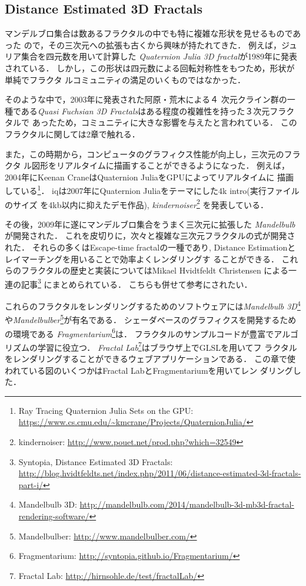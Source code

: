 \subsection{Distance Estimated 3D Fractals}

マンデルブロ集合は数あるフラクタルの中でも特に複雑な形状を見せるものであった
ので，その三次元への拡張も古くから興味が持たれてきた．
例えば，ジュリア集合を四元数を用いて計算した
\textit{Quaternion Julia 3D fractal}\cite{hart1989ray}が1989年に発表されている．
しかし，この形状は四元数による回転対称性をもつため，形状が単純でフラクタ
ルコミュニティの満足のいくものではなかった．

そのような中で，2003年に発表された阿原・荒木による４
次元クライン群の一種である\textit{Quasi Fuchsian 3D
Fractals}\cite{ahara2003sphairahedral}はある程度の複雑性を持った３次元フラクタルで
あったため，コミュニティに大きな影響を与えたと言われている．
このフラクタルに関しては2章で触れる．

また，この時期から，コンピュータのグラフィクス性能が向上し，三次元のフラクタ
ル図形をリアルタイムに描画することができるようになった．
例えば，2004年にKeenan CraneはQuaternion JuliaをGPUによってリアルタイムに
描画している\footnote{Ray Tracing Quaternion Julia Sets on
the GPU:
\url{https://www.cs.cmu.edu/~kmcrane/Projects/QuaternionJulia/}}．
iqは2007年にQuaternion Juliaをテーマにした4k intro(実行ファイルのサイズ
を4kb以内に抑えたデモ作品),
\textit{kindernoiser}\footnote{kindernoiser: \url{http://www.pouet.net/prod.php?which=32549}}
を発表している．

その後，2009年に遂にマンデルブロ集合をうまく三次元に拡張した
\textit{Mandelbulb}が開発された．
これを皮切りに，次々と複雑な三次元フラクタルの式が開発された．
それらの多くはEscape-time fractalの一種であり,
Distance Estimationとレイマーチングを用いることで効率よくレンダリングす
ることができる．
これらのフラクタルの歴史と実装についてはMikael Hvidtfeldt Christensen
による一連の記事\footnote{Syntopia, Distance Estimated 3D
Fractals:\\ \quad \quad
\url{http://blog.hvidtfeldts.net/index.php/2011/06/distance-estimated-3d-fractals-part-i/}}
にまとめられている．
こちらも併せて参考にされたい．

これらのフラクタルをレンダリングするためのソフトウェアには\textit{Mandelbulb
3D}\footnote{Mandelbulb 3D:
\url{http://mandelbulb.com/2014/mandelbulb-3d-mb3d-fractal-rendering-software/}}
や\textit{Mandelbulber}\footnote{Mandelbulber:
\url{http://www.mandelbulber.com/}}が有名である．
シェーダベースのグラフィクスを開発するための環境である
\textit{Fragmentarium}\footnote{Fragmentarium:
\url{http://syntopia.github.io/Fragmentarium/}}は．
フラクタルのサンプルコードが豊富でアルゴリズムの学習に役立つ．
\textit{Fractal Lab}\footnote{Fractal Lab:
\url{http://hirnsohle.de/test/fractalLab/}}はブラウザ上でGLSLを用いてフ
ラクタルをレンダリングすることができるウェブアプリケーションである．
この章で使われている図のいくつかはFractal LabとFragmentariumを用いてレン
ダリングした．

